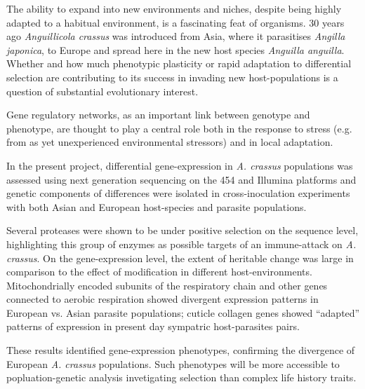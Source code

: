 


\begin{abstracts}        %

  The ability to expand into new environments and niches, despite
  being highly adapted to a habitual environment, is a fascinating
  feat of organisms. 30 years ago \textit{Anguillicola crassus} was
  introduced from Asia, where it parasitises \textit{Angilla
    japonica}, to Europe and spread here in the new host species
  \textit{Anguilla anguilla}. Whether and how much phenotypic
  plasticity or rapid adaptation to differential selection are
  contributing to its success in invading new host-populations is a
  question of substantial evolutionary interest.

  Gene regulatory networks, as an important link between genotype
  and phenotype, are thought to play a central role both in the
  response to stress (e.g. from as yet unexperienced environmental
  stressors) and in local adaptation.

  In the present project, differential gene-expression in
  \textit{A. crassus} populations was assessed using next generation
  sequencing on the 454 and Illumina platforms and genetic components
  of differences were isolated in cross-inoculation experiments with
  both Asian and European host-species and parasite populations.

  Several proteases were shown to be under positive selection on the
  sequence level, highlighting this group of enzymes as possible
  targets of an immune-attack on \textit{A. crassus}. On the
  gene-expression level, the extent of heritable change was large in
  comparison to the effect of modification in different
  host-environments. Mitochondrially encoded subunits of the
  respiratory chain and other genes connected to aerobic respiration
  showed divergent expression patterns in European vs. Asian parasite
  populations; cuticle collagen genes showed ``adapted'' patterns of
  expression in present day sympatric host-parasites pairs.
  
  These results identified gene-expression phenotypes, confirming the
  divergence of European \textit{A. crassus} populations. Such
  phenotypes will be more accessible to popluation-genetic analysis
  invetigating selection than complex life history traits.

\end{abstracts}



     